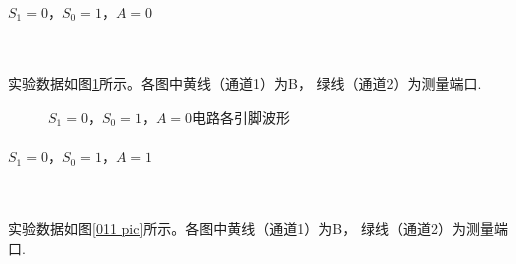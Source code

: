 \documentclass[UTF8]{ctexart}
\numberwithin{figure}{subsection}
\numberwithin{table}{subsection}
\numberwithin{equation}{subsection}
\begin{document}
\paragraph{\(S_1 = 0 ，S_0 = 1， A = 0\)}~
\par 实验数据如图\ref{010 pic}所示。各图中黄线（通道1）为B， 绿线（通道2）为测量端口.

\begin{figure}[H]
    \centering

    \caption{\(S_1 = 0 ，S_0 = 1， A = 0\)电路各引脚波形}
    \label{010 pic}
\end{figure}

\paragraph{\(S_1 = 0 ，S_0 = 1， A = 1\)}~
\par 实验数据如图\ref{011 pic}所示。各图中黄线（通道1）为B， 绿线（通道2）为测量端口.
\end{document}
